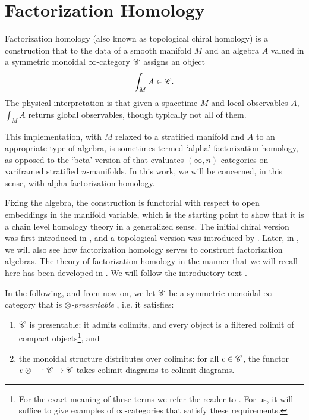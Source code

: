 \documentclass[../text]{subfiles}
\begin{document}
\section{Factorization Homology}\label{ch:fact_hom}

Factorization homology (also known as topological chiral homology) is a construction that to the data of a smooth manifold $M$ and an algebra $A$ valued in a symmetric monoidal $\infty$-category $\mathscr{C}$ assigns an object
%
\begin{equation}
    \int_{M} A \in \mathscr{C}.
\end{equation}
%
The physical interpretation is that given a spacetime $M$ and local observables $A$, $\int_MA$ returns global observables, though typically not all of them.

This implementation, with $M$ relaxed to a stratified manifold and $A$ to an appropriate type of algebra, is sometimes termed `alpha' factorization homology, as opposed to the `beta' version of \cite{ayala2020factorization} that evaluates $(\infty,n)$-categories on variframed stratified $n$-manifolds. In this work, we will be concerned, in this sense, with alpha factorization homology. 

Fixing the algebra, the construction is functorial with respect to open embeddings in the manifold variable, which is the starting point to show that it is a chain level homology theory in a generalized sense. The initial chiral version was first introduced in \cite{bd2004}, and a topological version was introduced by \cite{lurie_ha}. Later, in , we will also see how factorization homology serves to construct factorization algebras. The theory of factorization homology in the manner that we will recall here has been developed in \cite{francis2013,af_fhtop, aft_fhstrat}. We will follow the introductory text \cite{af_primer}.


In the following, and from now on, we let $\mathscr{C}$ be a symmetric monoidal $\infty$-category that is \emph{$\otimes$-presentable} \cite{af_fhtop}, i.e. it satisfies:
%
\begin{enumerate}
    \item $\mathscr{C}$ is presentable: it admits colimits, and every object is a filtered colimit of compact objects\footnote{For the exact meaning of these terms we refer the reader to \cite[§5.3]{lurie_htt}. For us, it will suffice to give examples of $\infty$-categories that satisfy these requirements.}, and
    \item the monoidal structure distributes over colimits: for all $c \in \mathscr{C}$, the functor $c \otimes -: \mathscr{C} \xrightarrow{} \mathscr{C}$ takes colimit diagrams to colimit diagrams.
\end{enumerate}
\end{document}
